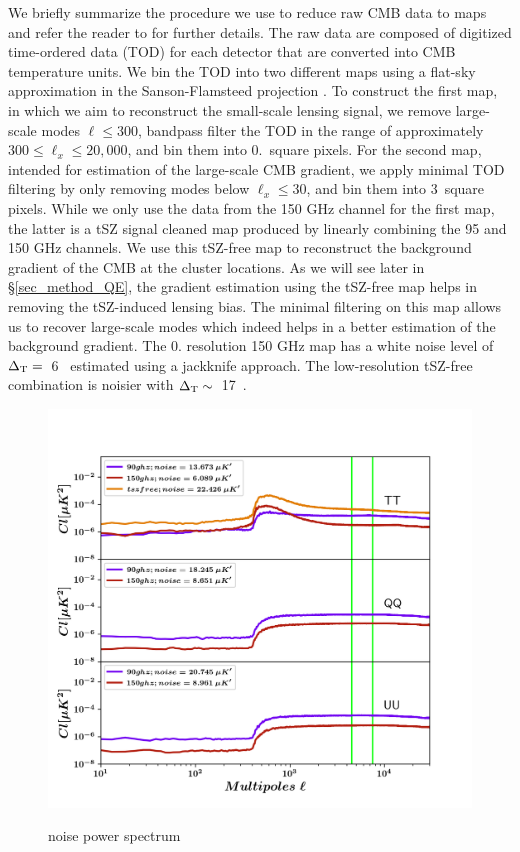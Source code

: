 We briefly summarize the procedure we use to reduce raw CMB data to maps and refer the reader to \cite{henning18} for further details. 
The raw data are composed of digitized time-ordered data (TOD) for each detector that are converted into CMB temperature units. %
We bin the TOD into two different maps using a flat-sky approximation in the Sanson-Flamsteed projection \citep{calabretta02, schaffer11}. 
To construct the first map, in which we aim to reconstruct the small-scale lensing signal, we remove large-scale modes $\ell \le 300$, bandpass filter the TOD in the range of approximately $300 \le \ell_{x} \le 20,000$, and bin them into 0.\ square pixels.
For the second map, intended for estimation of the large-scale CMB gradient, we apply minimal TOD filtering by only removing modes below $\ell_{x} \le 30$, and bin them into 3\am\ square pixels.
While we only use the data from the 150 GHz channel for the first map, the latter is a tSZ signal cleaned map produced by linearly combining the 95 and 150 GHz channels. 
We use this tSZ-free map to reconstruct the background gradient of the CMB at the cluster locations.
As we will see later in \S\ref{sec_method_QE}, the gradient estimation using the tSZ-free map helps in removing the tSZ-induced lensing bias.
The minimal filtering on this map allows us to recover large-scale modes which indeed helps in a better estimation of the background gradient.
The 0. resolution 150 GHz map has a white noise level of \mbox{$\Delta_{\rm T} = $ 6 \ukam} estimated using a jackknife approach. %
The low-resolution tSZ-free combination is noisier with \mbox{$\Delta_{\rm T} \sim $ 17 \ukam}.
\begin{figure}[ht]
\includegraphics[width= \columnwidth]{figs/noise_Cls_sanjay_maps_20170603.png}
\label{noise_ps}
\caption{noise power spectrum}
\end{figure}
